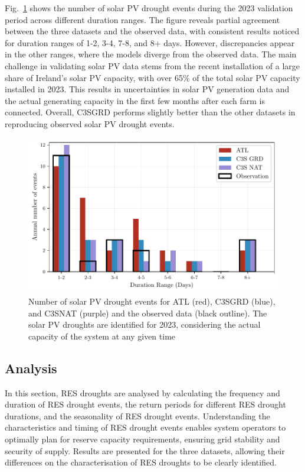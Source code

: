 \documentclass[preprint, 12pt]{elsarticle}
\providecommand{\DIFadd}[1]{{\protect\color{blue}\uwave{#1}}} %
\providecommand{\DIFaddbegin}{} %
\providecommand{\DIFaddend}{} %
\providecommand{\DIFaddFL}[1]{\DIFadd{#1}} %
\providecommand{\DIFaddbeginFL}{} %
\providecommand{\DIFaddendFL}{} %
\begin{document}
Fig.~\ref{fig:bar_number_events_verification_pv} shows the number of solar PV drought events during the 2023 validation period across different duration ranges. The figure reveals partial agreement between the three datasets and the observed data, with consistent results noticed for duration ranges of 1-2, 3-4, 7-8, and 8+ days. However, discrepancies appear in the other ranges, where the models diverge from the observed data. The main challenge in validating solar PV data stems from the recent installation of a large share of Ireland’s solar PV capacity, with over 65\% of the total solar PV capacity installed in 2023. This results in uncertainties in solar PV generation data and the actual generating capacity in the first few months after each farm is connected. Overall, C3S\DIFaddbegin \DIFadd{~}\DIFaddend GRD performs slightly better than the other datasets in reproducing observed solar PV drought events.

\begin{figure}[!ht]
	\centering
	\includegraphics[width=\textwidth]{verification_pv_number_events.pdf}
	\caption{Number of solar PV drought events for ATL (red), C3S\DIFaddbeginFL \DIFaddFL{~}\DIFaddendFL GRD (blue), and C3S\DIFaddbeginFL \DIFaddFL{~}\DIFaddendFL NAT (purple) and the observed data (black outline). The solar PV droughts are identified for 2023, considering the actual capacity of the system at any given time}
	\label{fig:bar_number_events_verification_pv}
\end{figure}

\subsection{Analysis}
\label{sec:analysis}

In this section, RES droughts are analysed by calculating the frequency and duration of RES drought events, the return periods for different RES drought durations, and the seasonality of RES drought events. Understanding the characteristics and timing of RES drought events enables system operators to optimally plan for reserve capacity requirements, ensuring grid stability and security of supply. Results are presented for the three datasets, allowing their differences on the characterisation of RES droughts to be clearly identified.
\end{document}
